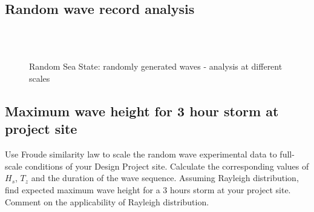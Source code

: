 \documentclass{article}
\begin{document}
	\subsection{Random wave record analysis}
	\begin{figure}[H]
		\centering
		\\
		\\
		\caption{Random Sea State: randomly generated waves - analysis at different scales}
		\label{randomgraph}
	\end{figure}
	\subsection{Maximum wave height for 3 hour storm at project site}
	Use Froude similarity law to scale the random wave experimental data to full-scale	conditions of your Design Project site. Calculate the corresponding values of $H_s$, $T_z$ and the duration of the wave sequence. Assuming Rayleigh distribution, find	expected maximum wave height for a 3 hours storm at your project site. Comment on the applicability of Rayleigh distribution.
\end{document}
